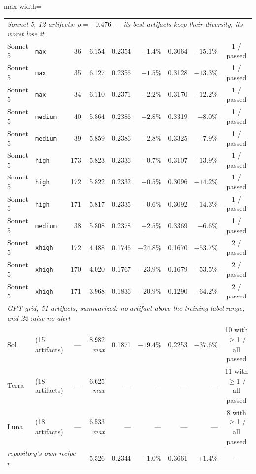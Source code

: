 \begin{table}[t]
\begin{adjustbox}{max width=\linewidth}
\begin{tabular}{llrrrrrrc}
\midrule
\multicolumn{9}{l}{\emph{Sonnet 5, 12 artifacts: $\rho=+0.476$ --- its best artifacts keep their diversity, its worst lose it}} \\
Sonnet 5 & \texttt{max}    &   36 & 6.154 & 0.2354 & $+1.4\%$  & 0.3064 & $-15.1\%$ & 1 / passed \\
Sonnet 5 & \texttt{max}    &   35 & 6.127 & 0.2356 & $+1.5\%$  & 0.3128 & $-13.3\%$ & 1 / passed \\
Sonnet 5 & \texttt{max}    &   34 & 6.110 & 0.2371 & $+2.2\%$  & 0.3170 & $-12.2\%$ & 1 / passed \\
Sonnet 5 & \texttt{medium} &   40 & 5.864 & 0.2386 & $+2.8\%$  & 0.3319 & $-8.0\%$  & 1 / passed \\
Sonnet 5 & \texttt{medium} &   39 & 5.859 & 0.2386 & $+2.8\%$  & 0.3325 & $-7.9\%$  & 1 / passed \\
Sonnet 5 & \texttt{high}   &  173 & 5.823 & 0.2336 & $+0.7\%$  & 0.3107 & $-13.9\%$ & 1 / passed \\
Sonnet 5 & \texttt{high}   &  172 & 5.822 & 0.2332 & $+0.5\%$  & 0.3096 & $-14.2\%$ & 1 / passed \\
Sonnet 5 & \texttt{high}   &  171 & 5.817 & 0.2335 & $+0.6\%$  & 0.3092 & $-14.3\%$ & 1 / passed \\
Sonnet 5 & \texttt{medium} &   38 & 5.808 & 0.2378 & $+2.5\%$  & 0.3369 & $-6.6\%$  & 1 / passed \\
Sonnet 5 & \texttt{xhigh}  &  172 & 4.488 & 0.1746 & $-24.8\%$ & 0.1670 & $-53.7\%$ & 2 / passed \\
Sonnet 5 & \texttt{xhigh}  &  170 & 4.020 & 0.1767 & $-23.9\%$ & 0.1679 & $-53.5\%$ & 2 / passed \\
Sonnet 5 & \texttt{xhigh}  &  171 & 3.968 & 0.1836 & $-20.9\%$ & 0.1290 & $-64.2\%$ & 2 / passed \\
\midrule
\multicolumn{9}{l}{\emph{GPT grid, 51 artifacts, summarized: no artifact above the training-label range, and 22 raise no alert}} \\
Sol   & (15 artifacts) & --- & 8.982 \emph{max} & 0.1871 & $-19.4\%$ & 0.2253 & $-37.6\%$ & 10 with $\ge$1 / all passed \\
Terra & (18 artifacts) & --- & 6.625 \emph{max} & --- & --- & --- & --- & 11 with $\ge$1 / all passed \\
Luna  & (18 artifacts) & --- & 6.533 \emph{max} & --- & --- & --- & --- & 8 with $\ge$1 / all passed \\
\midrule
\multicolumn{3}{l}{\emph{repository's own recipe $r$}} & 5.526 & 0.2344 & $+1.0\%$ & 0.3661 & $+1.4\%$ & --- \\

\end{tabular}
\end{adjustbox}
\end{table}
